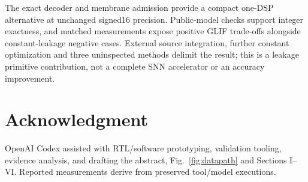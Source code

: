 \documentclass[conference]{IEEEtran}
\begin{document}
The exact decoder and membrane admission provide a compact one-DSP alternative at unchanged signed16 precision. Public-model checks support integer exactness, and matched measurements expose positive GLIF trade-offs alongside constant-leakage negative cases. External source integration, further constant optimization and three uninspected methods delimit the result; this is a leakage primitive contribution, not a complete SNN accelerator or an accuracy improvement.

\section*{Acknowledgment}
OpenAI Codex assisted with RTL/software prototyping, validation tooling, evidence analysis, and drafting the abstract, Fig.~\ref{fig:datapath} and Sections I--VI. Reported measurements derive from preserved tool/model executions.
\end{document}
